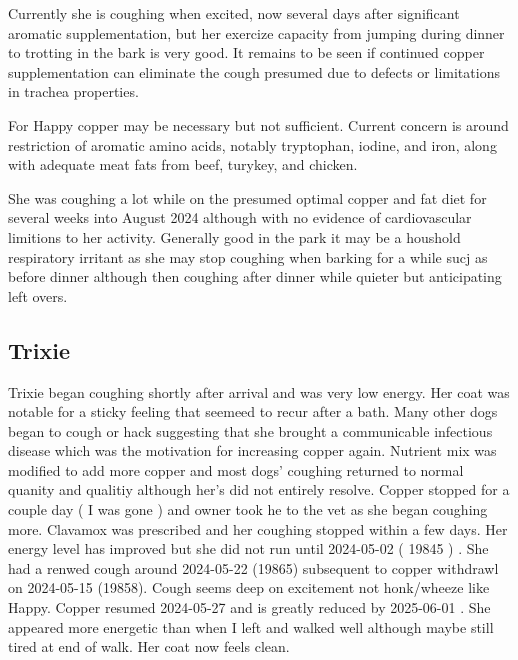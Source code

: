 Currently
she is coughing when excited, now several days after   significant
aromatic supplementation, but her exercize capacity from
jumping during dinner to trotting in the bark is very good.
It remains to be seen if continued copper supplementation can
eliminate the cough presumed due to defects or limitations in 
trachea properties.  

For Happy copper may be necessary but not sufficient. 
Current concern is around restriction of aromatic amino
acids, notably tryptophan, iodine, and iron, along with
adequate meat fats from beef, turykey, and chicken. 

She was coughing a lot while on the presumed optimal
copper and fat diet for several weeks into August
2024 although with no evidence of cardiovascular
limitions to her activity. Generally good in the park
it may be a houshold respiratory irritant  as she
may stop coughing when barking for a while  sucj as before
dinner although then coughing after dinner while quieter
but anticipating left overs. 


\mjmhappymisc



\subsection{Trixie}

\mjmtrixiecu

Trixie began coughing shortly after arrival and was
very low energy. Her coat was notable for a sticky
feeling that seemeed to recur after a bath.  
Many other dogs began to cough or
hack suggesting that she brought a communicable infectious
disease which was the motivation for increasing copper again. 
Nutrient mix was modified to add more copper and
most dogs' coughing returned to normal quanity and qualitiy
although her's did not entirely resolve. Copper stopped for a couple
day ( I was gone ) and owner took he to the vet as she
began coughing more. Clavamox was prescribed and her coughing
stopped within a few days. Her energy level has improved
but she did not  run until 2024-05-02 ( 19845 ) .  
She had a renwed cough around 2024-05-22 (19865)  subsequent to
copper withdrawl on 2024-05-15 (19858). 
Cough seems deep on excitement not honk/wheeze like Happy.
Copper resumed 2024-05-27 and is greatly reduced
by 2025-06-01 . 
She appeared more energetic than when I left and walked well
although maybe still tired at end of walk. 
Her coat now feels clean. 

